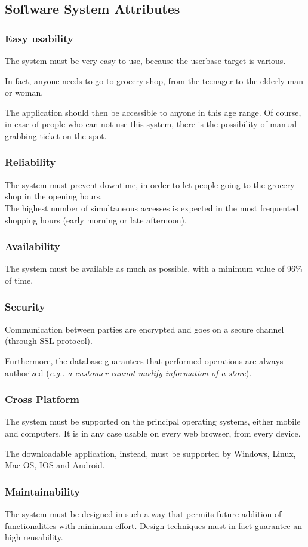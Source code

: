 \documentclass[table, 12pt]{article}
\begin{document}
\subsection{Software System Attributes}
\subsubsection{Easy usability}
The system must be very easy to use, because the userbase target is various.

In fact, anyone needs to go to grocery shop, from the teenager to the elderly man or woman.

The application should then be accessible to anyone in this age range. Of course, in case of people who can not use this system, there is the possibility of manual grabbing ticket on the spot.
\subsubsection{Reliability}
The system must prevent downtime, in order to let people going to the grocery shop in the opening hours. \\
The highest number of simultaneous accesses is expected in the most frequented shopping hours (early morning or late afternoon).
\subsubsection{Availability}
The system must be available as much as possible, with a minimum value of 96\% of time.
\subsubsection{Security}
Communication between parties are encrypted and goes on a secure channel (through SSL protocol).

Furthermore, the database guarantees that performed operations are always authorized (\textit{e.g.. a customer cannot modify information of a store}).
\subsubsection{Cross Platform}
The system must be supported on the principal operating systems, either mobile and computers. It is in any case usable on every web browser, from every device.

The downloadable application, instead, must be supported by Windows, Linux, Mac OS, IOS and Android.
\subsubsection{Maintainability}
The system must be designed in such a way that permits future addition of functionalities with minimum effort.
Design techniques must in fact guarantee an high reusability.
\newpage
\end{document}
